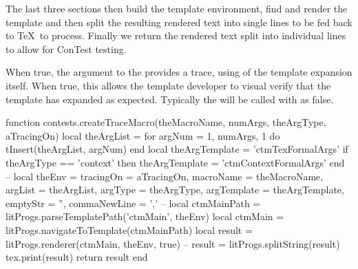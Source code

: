 The last three sections then build the template environment, find and 
render the  template and then split the resulting rendered 
text into single lines to be fed back to \TeX\ to process. Finally we 
return the rendered text split into individual lines to allow for ConTest 
testing. 

When true, the  argument to the  
provides a trace, using  of the template expansion 
itself. When true, this allows the template developer to visual verify 
that the template has expanded as expected. Typically the 
 will be called with  as false. 

\startLuaCode
function contests.createTraceMacro(theMacroName, numArgs, theArgType, aTracingOn)
  local theArgList = { }
  for argNum = 1, numArgs, 1 do
    tInsert(theArgList, argNum)
  end
  local theArgTemplate = 'ctmTexFormalArgs'
  if theArgType == 'context' then
    theArgTemplate = 'ctmContextFormalArgs'
  end
  --
  local theEnv   = {
    tracingOn    = aTracingOn,
    macroName    = theMacroName,
    argList      = theArgList,
    argType      = theArgType,
    argTemplate  = theArgTemplate,
    emptyStr     = '',
    commaNewLine = ',\n'
  }
  --
  local ctmMainPath = litProgs.parseTemplatePath('ctmMain', theEnv)
  local ctmMain     = litProgs.navigateToTemplate(ctmMainPath)
  local result      = litProgs.renderer(ctmMain, theEnv, true)
  --
  result            = litProgs.splitString(result)
  tex.print(result)
  return result
end
\stopLuaCode


